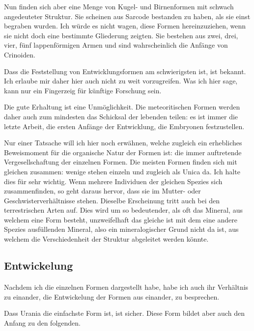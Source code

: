 \documentclass[a4paper, 12pt, oneside]{article}
\begin{document}
Nun finden sich aber eine Menge von Kugel- und Birnenformen mit schwach angedeuteter Struktur. Sie scheinen aus Sarcode bestanden zu haben, als sie einst begraben wurden. Ich würde es nicht wagen, diese Formen hereinzuziehen, wenn sie nicht doch eine bestimmte Gliederung zeigten. Sie bestehen aus zwei, drei, vier, fünf lappenförmigen Armen und sind wahrscheinlich die Anfänge von Crinoiden.

Dass die Feststellung von Entwicklungsformen am schwierigsten ist, ist bekannt. Ich erlaube mir daher hier auch nicht zu weit vorzugreifen. Was ich hier sage, kann nur ein Fingerzeig für künftige Forschung sein.

Die gute Erhaltung ist eine Unmöglichkeit. Die meteoritischen Formen werden daher auch zum mindesten das Schicksal der lebenden teilen: es ist immer die letzte Arbeit, die ersten Anfänge der Entwicklung, die Embryonen festzustellen.

Nur einer Tatsache will ich hier noch erwähnen, welche zugleich ein erhebliches Beweismoment für die organische Natur der Formen ist: die immer auftretende Vergesellschaftung der einzelnen Formen. Die meisten Formen finden sich mit gleichen zusammen: wenige stehen einzeln und zugleich als Unica da. Ich halte dies für sehr wichtig. Wenn mehrere Individuen der gleichen Spezies sich zusammenfinden, so geht daraus hervor, dass sie im Mutter- oder Geschwisterverhältnisse stehen. Dieselbe Erscheinung tritt auch bei den terrestrischen Arten auf. Dies wird um so bedeutender, als oft das Mineral, aus welchem eine Form besteht, unzweifelhaft das gleiche ist mit dem eine andere Spezies ausfüllenden Mineral, also ein mineralogischer Grund nicht da ist, aus welchem die Verschiedenheit der Struktur abgeleitet werden könnte.
\clearpage
\subsection{Entwickelung}
\paragraph{}
Nachdem ich die einzelnen Formen dargestellt habe, habe ich auch ihr Verhältnis zu einander, die Entwickelung der Formen aus einander, zu besprechen.

Dass Urania die einfachste Form ist, ist sicher. Diese Form bildet aber auch den Anfang zu den folgenden.
\end{document}
